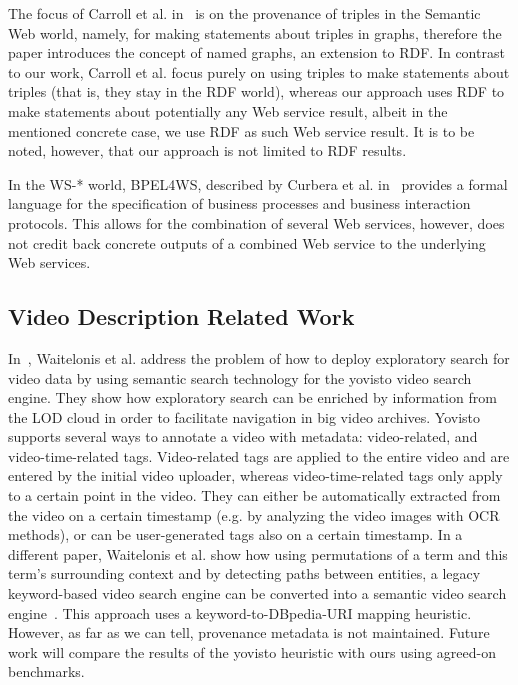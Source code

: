 \documentclass[conference]{IEEEtran}
\begin{document}
The focus of Carroll et al. in~\cite{carroll2005} is on the provenance of triples in the Semantic Web world, namely, for making statements about triples in graphs, therefore the paper introduces the concept of named graphs, an extension to RDF. In contrast to our work, Carroll et al. focus purely on using triples to make statements about triples (that is, they stay in the RDF world), whereas our approach uses RDF to make statements about potentially any Web service result, albeit in the mentioned concrete case, we use RDF as such Web service result. It is to be noted, however, that our approach is not limited to RDF results.

In the WS-* world, BPEL4WS, described by Curbera et al. in~\cite{Curbera:2003:NSW:944217.944234} provides a formal language for the specification of business processes and business interaction protocols. This allows for the combination of several Web services, however, does not credit back concrete outputs of a combined Web service to the underlying Web services.

\subsection{Video Description Related Work}

In~\cite{Sack:VideoSearch}, Waitelonis et al. address the problem of how to deploy exploratory search for video data by
using semantic search technology for the yovisto video search engine. They show how exploratory search can be enriched
by information from the LOD cloud in order to facilitate navigation in big video archives. Yovisto supports several
ways to annotate a video with metadata: video-related, and video-time-related tags. Video-related tags are applied to
the entire video and are entered by the initial video uploader, whereas video-time-related tags only apply to a certain
point in the video. They can either be automatically extracted from the video on a certain timestamp (e.g. by analyzing
the video images with OCR methods), or can be user-generated tags also on a certain timestamp. In a different paper,
Waitelonis et al. show how using permutations of a term and this term's surrounding context and by detecting paths
between entities, a legacy keyword-based video search engine can be converted into a semantic video search
engine~\cite{Sack:Use}. This approach uses a keyword-to-DBpedia-URI mapping heuristic. However, as far as we can tell,
provenance metadata is not maintained. Future work will compare the results of the yovisto heuristic with ours using
agreed-on benchmarks.
\end{document}
